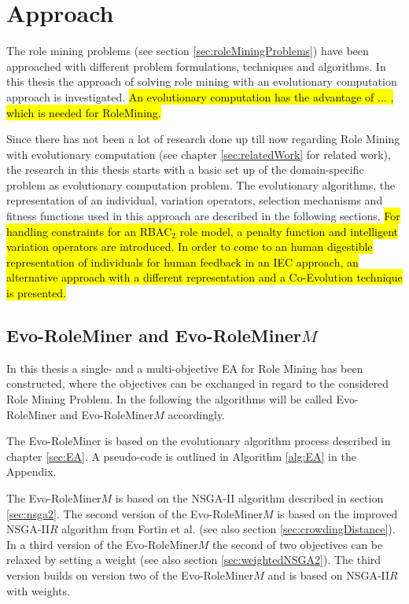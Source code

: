 \newpage
\chapter{Approach}
\label{sec:approach}
The role mining problems (see section \ref{sec:roleMiningProblems}) have been approached with different problem formulations, techniques and algorithms. In this thesis the approach of solving role mining with an evolutionary computation approach is investigated. \hl{An evolutionary computation has the advantage of ... , which is needed for RoleMining.}

Since there has not been a lot of research done up till now regarding Role Mining with evolutionary computation (see chapter \ref{sec:relatedWork} for related work), the research in this thesis starts with a basic set up of the domain-specific problem as evolutionary computation problem. The evolutionary algorithms, the representation of an individual, variation operators, selection mechanisms and fitness functions used in this approach are described in the following sections. \hl{For handling constraints for an RBAC$_2$ role model, a penalty function and intelligent variation operators are introduced. In order to come to an human digestible representation of individuals for human feedback in an IEC approach, an alternative approach with a different representation and a Co-Evolution technique is presented.}

	\section{Evo-RoleMiner and Evo-RoleMiner$M$}
	In this thesis a single- and a multi-objective EA for Role Mining has been constructed, where the objectives can be exchanged in regard to the considered Role Mining Problem. In the following the algorithms will be called Evo-RoleMiner and Evo-RoleMiner$M$ accordingly.
	
	The Evo-RoleMiner is based on the evolutionary algorithm process described in chapter \ref{sec:EA}. A pseudo-code is outlined in Algorithm \ref{alg:EA} in the Appendix.
	
	The Evo-RoleMiner$M$ is based on the NSGA-II algorithm described in section \ref{sec:nsga2}. The second version of the Evo-RoleMiner$M$ is based on the improved NSGA-II$R$ algorithm from Fortin et al.\cite{Fortin:2013} (see also section \ref{sec:crowdingDistance}). In a third version of the Evo-RoleMiner$M$ the second of two objectives can be relaxed by setting a weight (see also section \ref{sec:weightedNSGA2}). The third version builds on version two of the Evo-RoleMiner$M$ and is based on NSGA-II$R$ with weights.
    
